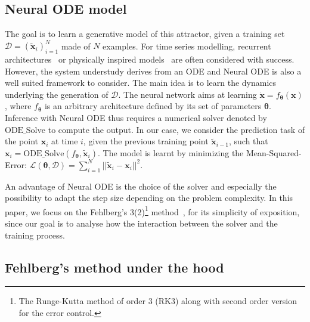 \documentclass{article}
\newcommand{\dataset}{\ensuremath{\mathcal{D}}}
\newcommand{\loss}{\ensuremath{\mathcal{L}}}
\newcommand{\ntrain}{\ensuremath{N}}
\newcommand{\x}{\ensuremath{\mathbf{x}}} %
\newcommand{\tx}{\ensuremath{\tilde{\mathbf{x}}}} %
\newcommand{\params}{\ensuremath{\boldsymbol{\theta}}}
\newcommand{\nnet}{\ensuremath{f_{\params}}}
\begin{document}
\subsection{Neural ODE model}
\label{ssec:NODE-1}

The goal is to learn a generative model of this attractor, given a
training set $\dataset=(\tx_{i})_{i=1}^{\ntrain}$ made of $\ntrain$
examples. For time series modelling, recurrent
architectures~\cite{Nassar18Tree,Dubois20Data} or physically inspired
models~\cite{Greydanus19Hamlitonian} are often considered with
success. However, the system understudy derives from an ODE and Neural
ODE is also a well suited framework to consider.
The main idea is to learn the dynamics underlying the generation of
$\dataset$. The neural network aims at learning
$ \dot{\x} = \nnet (\x)$, where $\nnet$ is an arbitrary architecture
defined by its set of parameters $\params$. Inference with Neural ODE
thus requires a numerical solver denoted by $\textrm{ODE\_Solve}$ to
compute the output. In our case, we consider the prediction task of
the point ${\x}_{i}$ at time $i$, given the previous training point
$\tx_{i-1}$, such that ${\x}_{i}=\textrm{ODE\_Solve}(\nnet, \tx_i)$.
The model is learnt by minimizing the Mean-Squared-Error:
$\loss(\params, \dataset) = \sum_{i=1}^{N} ||\tilde{\x}_i - \x_i
||^2$.


An advantage of Neural ODE is the  choice of the solver and
especially the possibility to adapt the step size depending on the
problem complexity. In this paper, we focus on the Fehlberg's 3(2)\footnote{The Runge-Kutta method of order 3 (RK3)
  along with second order version for the error control.}
method~\cite{Fehlberg68}, for its
simplicity of exposition, since our goal is to analyse  how the interaction between the solver
and the training process.


\subsection{Fehlberg's method under the hood}
\label{ssec:fehlberg}
\end{document}
